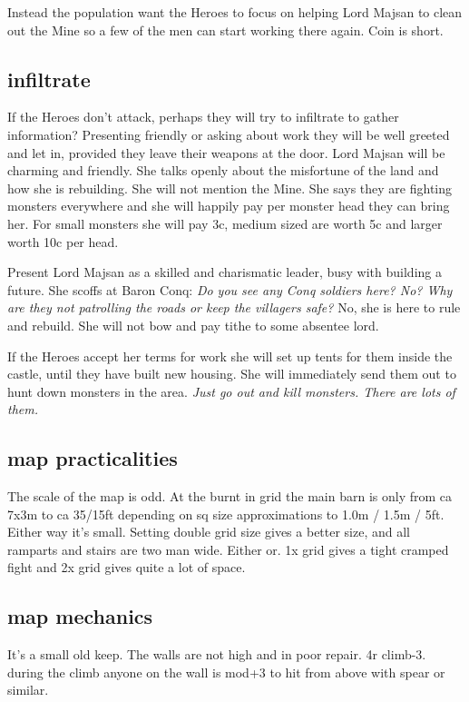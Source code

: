 Instead the population want the Heroes to focus on helping Lord Majsan to clean out the Mine so a few of the men can start working there again. Coin is short.


\subsection*{infiltrate}
If the Heroes don't attack, perhaps they will try to infiltrate to gather information? Presenting friendly or asking about work they will be well greeted and let in, provided they leave their weapons at the door. Lord Majsan will be charming and friendly. She talks openly about the misfortune of the land and how she is rebuilding. She will not mention the Mine. She says they are fighting monsters everywhere and she will happily pay per monster head they can bring her. For small monsters she will pay 3c, medium sized are worth 5c and larger worth 10c per head.

Present Lord Majsan as a skilled and charismatic leader, busy with building a future. She scoffs at Baron Conq: \textit{Do you see any Conq soldiers here? No? Why are they not patrolling the roads or keep the villagers safe?} No, she is here to rule and rebuild. She will not bow and pay tithe to some absentee lord.

If the Heroes accept her terms for work she will set up tents for them inside the castle, until they have built new housing. She will immediately send them out to hunt down monsters in the area. \textit{Just go out and kill monsters. There are lots of them.}


\subsection*{map practicalities}
The scale of the map is odd. At the burnt in grid the main barn is only from ca 7x3m to ca 35/15ft depending on sq size approximations to 1.0m / 1.5m / 5ft. Either way it's small. Setting double grid size gives a better size, and all ramparts and stairs are two man wide.
Either or. 1x grid gives a tight cramped fight and 2x grid gives quite a lot of space.


\subsection*{map mechanics}
It's a small old keep. The walls are not high and in poor repair. 4r climb-3. during the climb anyone on the wall is mod+3 to hit from above with spear or similar.

